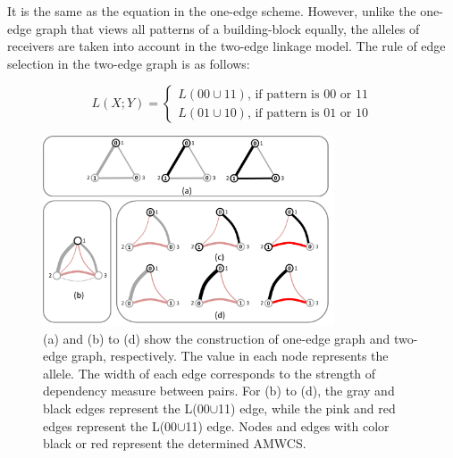 \documentclass{sig-alternate-05-2015}
\begin{document}
 It is the same as the equation in the  one-edge scheme. However, unlike the one-edge graph that views all patterns of a building-block equally, the alleles of receivers are taken into account in the two-edge linkage model. The rule of edge selection in the two-edge graph is as follows:

\begin{equation}
L(X;Y) = 
   \begin{cases}
    L(00\cup11) \text{, if pattern is 00 or 11} \\
    L(01\cup10) \text{, if pattern is 01 or 10} 
	\end{cases}
\end{equation}



\begin{figure}
\centering
\includegraphics[width=3.4in]{AMWCS}
\caption{(a)  and (b) to (d) show the construction of  one-edge graph and two-edge graph, respectively. The value in each node represents the allele. The width of each edge corresponds to the strength of dependency measure between pairs. For (b) to (d), the gray and black edges represent the L(00$\cup$11) edge, while the pink and red edges represent the L(00$\cup$11) edge. Nodes and edges with color black or red represent the determined AMWCS.}
\end{figure}
\end{document}
